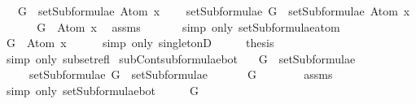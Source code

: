 \begin{isabellebody}
\ \ \ {\isachardoublequoteopen}G\ {\isasymin}\ setSubformulae\ {\isacharparenleft}Atom\ x{\isacharparenright}{\isachardoublequoteclose}\ \isanewline
\ \ \ {\isachardoublequoteopen}setSubformulae\ G\ {\isasymsubseteq}\ setSubformulae\ {\isacharparenleft}Atom\ x{\isacharparenright}{\isachardoublequoteclose}\isanewline
%
\isadelimproof
%
\endisadelimproof
%
\isatagproof
{}\isamarkupfalse%
\ {\isacharminus}\ \isanewline
\ \ \isamarkupfalse%
\ {\isachardoublequoteopen}G\ {\isasymin}\ {\isacharbraceleft}Atom\ x{\isacharbraceright}{\isachardoublequoteclose}\ \isamarkupfalse%
\ assms\ \isanewline
\ \ \ \ \isamarkupfalse%
\ {\isacharparenleft}simp\ only{\isacharcolon}\ setSubformulae{\isacharunderscore}atom{\isacharparenright}\isanewline
\ \ \isamarkupfalse%
\ \isamarkupfalse%
\ {\isachardoublequoteopen}G\ {\isacharequal}\ Atom\ x{\isachardoublequoteclose}\isanewline
\ \ \ \ \isamarkupfalse%
\ {\isacharparenleft}simp\ only{\isacharcolon}\ singletonD{\isacharparenright}\isanewline
\ \ \isamarkupfalse%
\ \isamarkupfalse%
\ {\isacharquery}thesis\isanewline
\ \ \ \ \isamarkupfalse%
\ {\isacharparenleft}simp\ only{\isacharcolon}\ subset{\isacharunderscore}refl{\isacharparenright}\isanewline
{}\isamarkupfalse%
%
\endisatagproof
{\isafoldproof}%
%
\isadelimproof
\isanewline
%
\endisadelimproof
\isanewline
{}\isamarkupfalse%
\ subContsubformulae{\isacharunderscore}bot{\isacharcolon}\isanewline
\ \ \ {\isachardoublequoteopen}G\ {\isasymin}\ setSubformulae\ {\isasymbottom}{\isachardoublequoteclose}\ \isanewline
\ \ \ \ \ {\isachardoublequoteopen}setSubformulae\ G\ {\isasymsubseteq}\ setSubformulae\ {\isasymbottom}{\isachardoublequoteclose}\isanewline
%
\isadelimproof
%
\endisadelimproof
%
\isatagproof
{}\isamarkupfalse%
\ {\isacharminus}\isanewline
\ \ \isamarkupfalse%
\ {\isachardoublequoteopen}G\ {\isasymin}\ {\isacharbraceleft}{\isasymbottom}{\isacharbraceright}{\isachardoublequoteclose}\isanewline
\ \ \ \ \isamarkupfalse%
\ assms\isanewline
\ \ \ \ \isamarkupfalse%
\ {\isacharparenleft}simp\ only{\isacharcolon}\ setSubformulae{\isacharunderscore}bot{\isacharparenright}\isanewline
\ \ \isamarkupfalse%
\ \isamarkupfalse%
\ {\isachardoublequoteopen}G\ {\isacharequal}\ {\isasymbottom}{\isachardoublequoteclose}\isanewline

\end{isabellebody}
